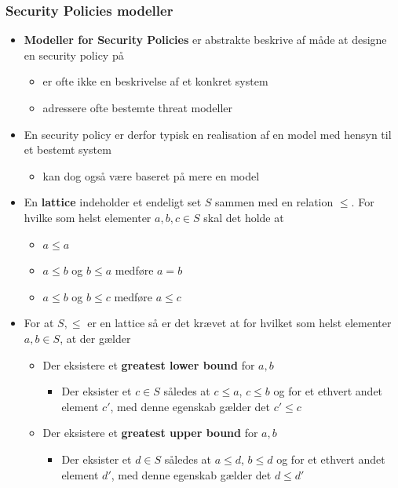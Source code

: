 \documentclass[a4, english]{article}
\begin{document}
\subsubsection{Security Policies modeller}
\begin{itemize}
	\item \textbf{Modeller for Security Policies} er abstrakte beskrive af måde at designe en security policy på  
  \begin{itemize}
  	\item er ofte ikke en beskrivelse af et konkret system
    \item adressere ofte bestemte threat modeller 
  \end{itemize}
  \item En security policy er derfor typisk en realisation af en model med hensyn til et bestemt system 
  \begin{itemize}
  	\item kan dog også være baseret på mere en model  
  \end{itemize}
  \item En \textbf{lattice} indeholder et endeligt set $S$ sammen med en relation $\leq$. For hvilke som helst elementer $a,b,c \in S$ skal det holde at
  \begin{itemize}
  	\item $a \leq a$
    \item $a \leq b$ og $b \leq a$ medføre $a=b$  
    \item $a \leq b$ og $b \leq c$ medføre $a \leq c$ 
  \end{itemize}
  \item For at $S, \leq$ er en lattice så er det krævet at for hvilket som helst elementer $a,b \in S$, at der gælder 
  \begin{itemize}
  	\item Der eksistere et \textbf{greatest lower bound} for $a,b$ 
    \begin{itemize}
    	\item Der eksister et $c \in S$ således at $c \leq a$, $c \leq b$ og for et ethvert andet element $c'$, med denne egenskab gælder det $c' \leq c$ 
    \end{itemize}
  	\item Der eksistere et \textbf{greatest upper bound} for $a,b$ 
    \begin{itemize}
    	\item Der eksister et $d \in S$ således at $a \leq d$, $b \leq d$ og for et ethvert andet element $d'$, med denne egenskab gælder det $d \leq d'$  

\end{itemize}
\end{itemize}
\end{itemize}
\end{document}
